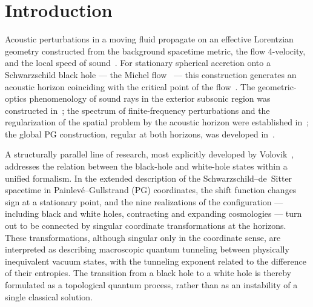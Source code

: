 \documentclass[12pt,a4paper,preprint]{elsarticle}
\begin{document}
    \section{Introduction}\label{sec:introduction}
        Acoustic perturbations in a moving fluid propagate on an effective Lorentzian geometry constructed from the background spacetime metric, the flow 4-velocity, and the local speed of sound~\cite{UnruhWG_ExperimentalBlackHoleEvaporation_1981, VisserM_AcousticBlackHolesHorizonsErgospheresAndHawkingRadiation_1998, BarceloC_LiberatiS_VisserM_AnalogueGravity_2011}. For stationary spherical accretion onto a Schwarzschild black hole --- the Michel flow~\cite{MichelFC_AccretionOfMatterByCondensedObjects_1972} --- this construction generates an acoustic horizon coinciding with the critical point of the flow~\cite{SemyannikovAV_AcousticGeometryAndSoundRayDynamicsInRelativisticSphericalAccretion_2026}. The geometric-optics phenomenology of sound rays in the exterior subsonic region was constructed in~\cite{SemyannikovAV_AcousticGeometryAndSoundRayDynamicsInRelativisticSphericalAccretion_2026}; the spectrum of finite-frequency perturbations and the regularization of the spatial problem by the acoustic horizon were established in~\cite{SemyannikovAV_PerturbationSpectrumOfMichelFlowAcousticVorticalAndEntropyModes_2026}; the global PG construction, regular at both horizons, was developed in~\cite{SemyannikovAV_GlobalAcousticGeometryOfMichelFlowInPainleveGullstrandCoordinates_2026}.
        
        A structurally parallel line of research, most explicitly developed by Volovik~\cite{VolovikGE_PainleveGullstrandCoordinatesForSchwarzschildDeSitterSpacetime_2023}, addresses the relation between the black-hole and white-hole states within a unified formalism. In the extended description of the Schwarzschild--de~Sitter spacetime in Painlev\'{e}--Gullstrand (PG) coordinates, the shift function changes sign at a stationary point, and the nine realizations of the configuration --- including black and white holes, contracting and expanding cosmologies --- turn out to be connected by singular coordinate transformations at the horizons. These transformations, although singular only in the coordinate sense, are interpreted as describing macroscopic quantum tunneling between physically inequivalent vacuum states, with the tunneling exponent related to the difference of their entropies. The transition from a black hole to a white hole is thereby formulated as a topological quantum process, rather than as an instability of a single classical solution.
        
\end{document}

